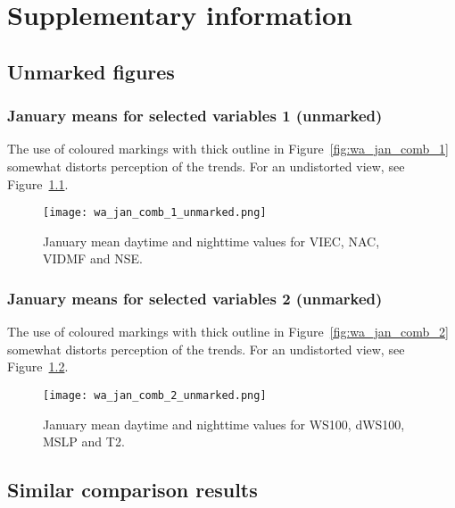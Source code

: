 \chapter{Supplementary information}
\label{app:supp}

\section{Unmarked figures}
\label{sec:unmarked}

\subsection{January means for selected variables 1 (unmarked)}

The use of coloured markings with thick outline in Figure~\ref{fig:wa_jan_comb_1} somewhat distorts perception of the trends. For an undistorted view, see Figure~\ref{fig:wa_jan_comb_1_unmarked}.

\begin{figure}[!htp]
	\centering
	\texttt{[image: wa\_jan\_comb\_1\_unmarked.png]}
	\caption[January means for selected variables 1 (unmarked)]{January mean daytime and nighttime values for \acs{VIEC}, \acs{NAC}, \acs{VIDMF} and \acs{NSE}.}
	\label{fig:wa_jan_comb_1_unmarked}
\end{figure}

\subsection{January means for selected variables 2 (unmarked)}

The use of coloured markings with thick outline in Figure~\ref{fig:wa_jan_comb_2} somewhat distorts perception of the trends. For an undistorted view, see Figure~\ref{fig:wa_jan_comb_2_unmarked}.

\begin{figure}[!htp]
	\centering
	\texttt{[image: wa\_jan\_comb\_2\_unmarked.png]}
	\caption[January means for selected variables 2 (unmarked)]{January mean daytime and nighttime values for \acs{WS100}, \acs{dWS100}, \acs{MSLP} and \acs{T2}.}
	\label{fig:wa_jan_comb_2_unmarked}
\end{figure}

\section{Similar comparison results}
\label{sec:results_sim}

